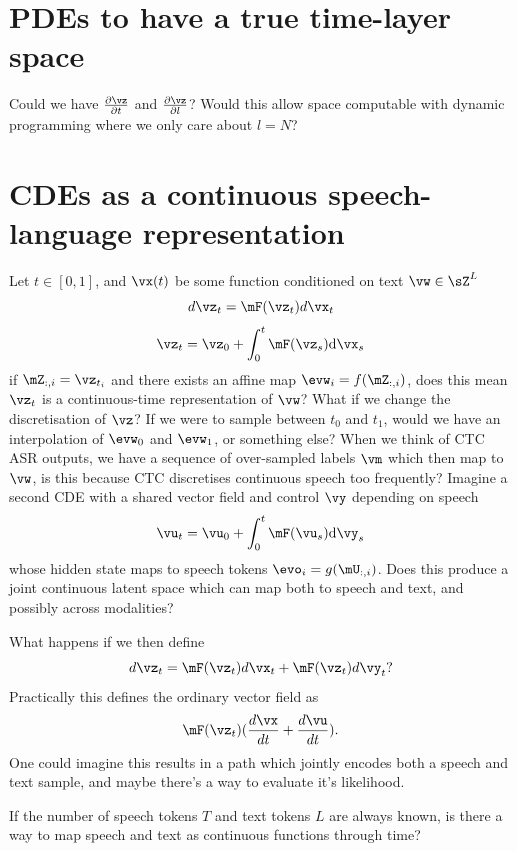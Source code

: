 \section{PDEs to have a true time-layer space}
Could we have $\frac{\partial \vz}{\partial t}$ and $\frac{\partial \vz}{\partial l}$? Would this allow space computable with dynamic programming where we only care about $l=N$?

\section{CDEs as a continuous speech-language representation}
Let $t\in[0,1]$, and $\vx(t)$ be some function conditioned on text $\vw\in\sZ^L$
\[
d\vz_t=\mF(\vz_t)d\vx_t
\]
\[
\vz_t=\vz_0 + \int_0^t \mF(\vz_s)\mathrm{d}\vx_s
\]
if $\mZ_{:,i} = \vz_{t_i}$ and there exists an affine map $\evw_i=f(\mZ_{:,i})$, does this mean $\vz_t$ is a continuous-time representation of $\vw$? What if we change the discretisation of $\vz$? If we were to sample between $t_0$ and $t_1$, would we have an interpolation of $\evw_0$ and $\evw_1$, or something else? When we think of CTC ASR outputs, we have a sequence of over-sampled labels $\vm$ which then map to $\vw$, is this because CTC discretises continuous speech too frequently? Imagine a second CDE with a shared vector field and control $\vy$ depending on speech
\[
\vu_t=\vu_0 + \int_0^t \mF(\vu_s)\mathrm{d}\vy_s
\]
whose hidden state maps to speech tokens $\evo_i=g(\mU_{:,i})$. Does this produce a joint continuous latent space which can map both to speech and text, and possibly across modalities?

What happens if we then define
\[
d\vz_t=\mF(\vz_t)d\vx_t + \mF(\vz_t)d\vy_t?
\]
Practically this defines the ordinary vector field as 
\[
\mF(\vz_t)(\frac{d\vx}{dt} + \frac{d\vu}{dt}).
\]
One could imagine this results in a path which jointly encodes both a speech and text sample, and maybe there's a way to evaluate it's likelihood.

If the number of speech tokens $T$ and text tokens $L$ are always known, is there a way to map speech and text as continuous functions through time?

